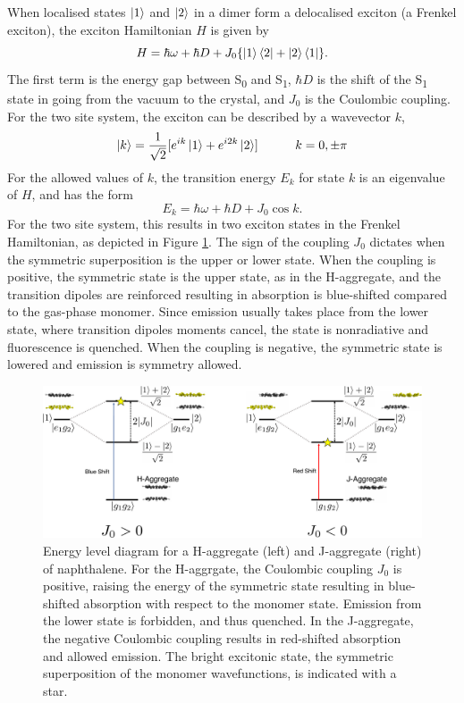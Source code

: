 When localised states $\ket{1}$ and $\ket{2}$ in a dimer form a delocalised exciton (a Frenkel exciton), the exciton Hamiltonian $H$ is given by
\begin{equation}
H=\hbar\omega + \hbar{}D + J_{0}\{\ket{1}\bra{2}+\ket{2}\bra{1}\}.
\end{equation}
The first term is the energy gap between S\textsubscript{0} and S\textsubscript{1},  $\hbar{}D$ is the shift of the S\textsubscript{1} state in going from the vacuum to the crystal, and $J_{0}$ is the Coulombic coupling.\cite{Spano} For the two site system, the exciton can be described by a wavevector $k$,
\begin{equation}
\ket{k}=\frac{1}{\sqrt{2}}[e^{ik}\ket{1}+  e^{i2k}\ket{2}]\qquad\quad k=0,\pm{\pi}
\end{equation}
For the allowed values of $k$, the transition energy $E_k$ for state $k$ is an eigenvalue of $H$, and has the form
\begin{equation}
E_{k}=\hbar\omega + \hbar{}D +J_{0}\cos{k}.
\end{equation}
For the two site system, this results in two exciton states in the Frenkel Hamiltonian, as depicted in Figure \ref{figure: H_J_Aggregates}. The sign of the coupling $J_{0}$ dictates when the symmetric superposition is the upper or lower state. When the coupling is positive, the symmetric state is the upper state, as in the H-aggregate, and the transition dipoles are reinforced resulting in absorption is blue-shifted compared to the gas-phase monomer. Since emission usually takes place from the lower state, where transition dipoles moments cancel, the state is nonradiative and fluorescence is quenched. When the coupling is negative, the symmetric state is lowered and emission is symmetry allowed.\cite{Hestand2017}
\begin{figure}[H]
\centering
  \includegraphics[width=\linewidth]{Intro/H_J_aggregates.pdf}
  \caption[Exciton energy level diagram for H- and J-aggregates]{Energy level diagram for a H-aggregate (left) and J-aggregate (right) of naphthalene. For the H-aggrgate, the Coulombic coupling $J_{0}$ is positive, raising the energy of the symmetric state resulting in blue-shifted absorption with respect to the monomer state. Emission from the lower state is forbidden, and thus quenched. In the J-aggregate, the negative Coulombic coupling results in red-shifted absorption and allowed emission. The bright excitonic state, the symmetric superposition of the monomer wavefunctions, is indicated with a star.}
  \label{figure: H_J_Aggregates}
\end{figure}
